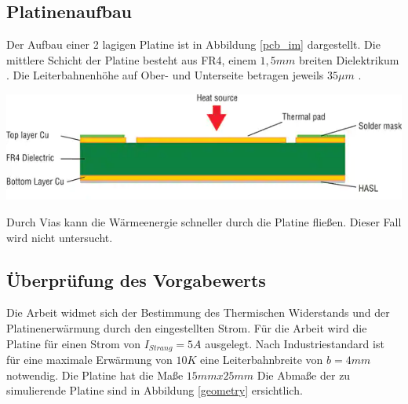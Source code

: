 \documentclass[10pt,a4paper,oneside,abstracton]{scrartcl}
\newenvironment{Figure}
  {\par\medskip\noindent\minipage{\linewidth}}
  {\endminipage\par\medskip}
\begin{document}
\begin{multicols}{2}
\subsection{Platinenaufbau}
Der Aufbau einer 2 lagigen Platine ist in Abbildung \ref*{pcb_im} dargestellt. 
\newline
Die mittlere Schicht der Platine besteht aus FR4, einem $ 1,5mm $ breiten Dielektrikum \cite{PCB_Querschnitt}. 
Die Leiterbahnenhöhe auf Ober- und Unterseite betragen jeweils $ 35 \mu m$ \cite{aisler}.
\begin{Figure}
	\includegraphics[width=\textwidth]{Bilder/PCB_Querschnitt.png}
	\label{pcb_im}
\end{Figure}

\noindent
Durch Vias kann die Wärmeenergie schneller durch die Platine fließen. 
Dieser Fall wird nicht untersucht.

\noindent



\subsection{Überprüfung des Vorgabewerts}
Die Arbeit widmet sich der Bestimmung des Thermischen Widerstands und der 
Platinenerwärmung durch den eingestellten Strom. 
\newline
Für die Arbeit wird die Platine für einen Strom von $I_{Strang} = 5 A $ ausgelegt. 
\newline
Nach Industriestandard ist für eine maximale Erwärmung von $10 K$ eine Leiterbahnbreite von $b = 4 mm $ notwendig\cite{ipc}. 
Die Platine hat die Maße $15mm x 25mm$
Die Abmaße der zu simulierende Platine sind in Abbildung \ref*{geometry} ersichtlich.



\end{multicols}
\end{document}
